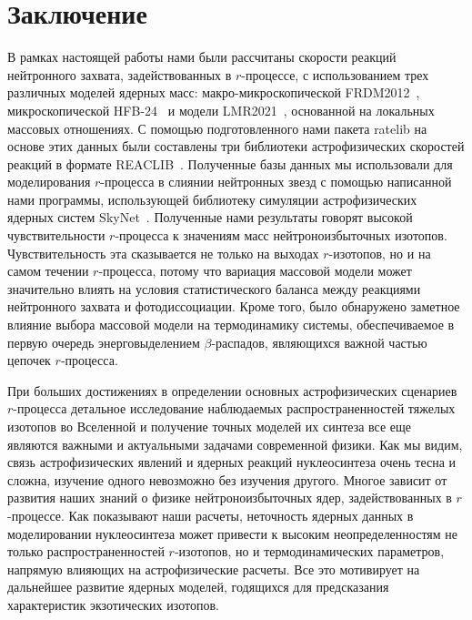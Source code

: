\section*{Заключение}
В рамках настоящей работы нами были рассчитаны скорости реакций нейтронного захвата, задействованных в $r$-процессе, с использованием трех различных моделей ядерных масс: макро-микроскопической FRDM2012~\cite{moller2016}, микроскопической HFB-24~\cite{goriely2013} и модели LMR2021~\cite{vladimirova2022}, основанной на локальных массовых отношениях. С помощью подготовленного нами пакета ratelib на основе этих данных были составлены три библиотеки астрофизических скоростей реакций в формате REACLIB~\cite{reaclib2010}. Полученные базы данных мы использовали для моделирования $r$-процесса в слиянии нейтронных звезд с помощью написанной нами программы, использующей библиотеку симуляции астрофизических ядерных систем SkyNet~\cite{lippuner2015}. Полученные нами результаты говорят высокой чувствительности $r$-процесса к значениям масс нейтроноизбыточных изотопов. Чувствительность эта сказывается не только на выходах $r$-изотопов, но и на самом течении $r$-процесса, потому что вариация массовой модели может значительно влиять на условия статистического баланса между реакциями нейтронного захвата и фотодиссоциации. Кроме того, было обнаружено заметное влияние выбора массовой модели на термодинамику системы, обеспечиваемое в первую очередь энерговыделением $\beta$-распадов, являющихся важной частью цепочек $r$-процесса.

При больших достижениях в определении основных астрофизических сценариев $r$-процесса детальное исследование наблюдаемых распространенностей тяжелых изотопов во Вселенной и получение точных моделей их синтеза все еще являются важными и актуальными задачами современной физики. Как мы видим, связь астрофизических явлений и ядерных реакций нуклеосинтеза очень тесна и сложна, изучение одного невозможно без изучения другого. Многое зависит от развития наших знаний о физике нейтроноизбыточных ядер, задействованных в $r$-процессе. Как показывают наши расчеты, неточность ядерных данных в моделировании нуклеосинтеза может привести к высоким неопределенностям не только распространенностей $r$-изотопов, но и термодинамических параметров, напрямую влияющих на астрофизические расчеты. Все это мотивирует на дальнейшее развитие ядерных моделей, годящихся для предсказания характеристик экзотических изотопов.
